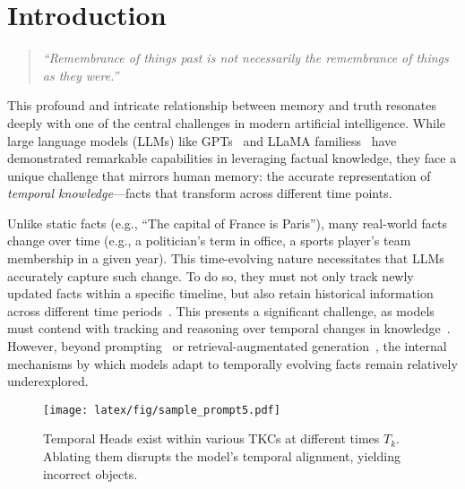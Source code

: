 \section{Introduction}
\begin{quote}
    \emph{``Remembrance of things past is not necessarily the remembrance of things as they were.''~\citep{proust}}
\end{quote}
This profound and intricate relationship between memory and truth resonates deeply with one of the central challenges in modern artificial intelligence. 
While large language models (LLMs) like GPTs~\citep{chatgpt, gpt4omini, gpto1} and LLaMA familiess~\citep{llama, llama2, llama3} have demonstrated remarkable capabilities in leveraging factual knowledge, they face a unique challenge that mirrors human memory: 
the accurate representation of \emph{temporal knowledge}—facts that transform across different time points.

Unlike static facts (e.g., “The capital of France is Paris”), many real-world facts change over time (e.g., a politician’s term in office, a sports player’s team membership in a given year). 
This time-evolving nature necessitates that LLMs accurately capture such change.
To do so, they must not only track newly updated facts within a specific timeline, but also retain historical information across different time periods~\citep{temporalwiki}.
This presents a significant challenge, as models must contend with tracking and reasoning over temporal changes in knowledge~\citep{realtime}.
However, beyond prompting~\citep{serac, chroknowledge} or retrieval-augmentated generation~\citep{rag, hipporag}, the internal mechanisms by which models adapt to temporally evolving facts remain relatively underexplored.

\begin{figure}[t]
\begin{center}
    \texttt{[image: latex/fig/sample\_prompt5.pdf]}
\end{center}%
\vspace{-10pt}%
\caption{Temporal Heads exist within various TKCs at different times $T_k$.
Ablating them disrupts the model's temporal alignment, yielding incorrect objects.
}
\label{fig:intro_sample}
\vspace{-20pt}
\end{figure}

